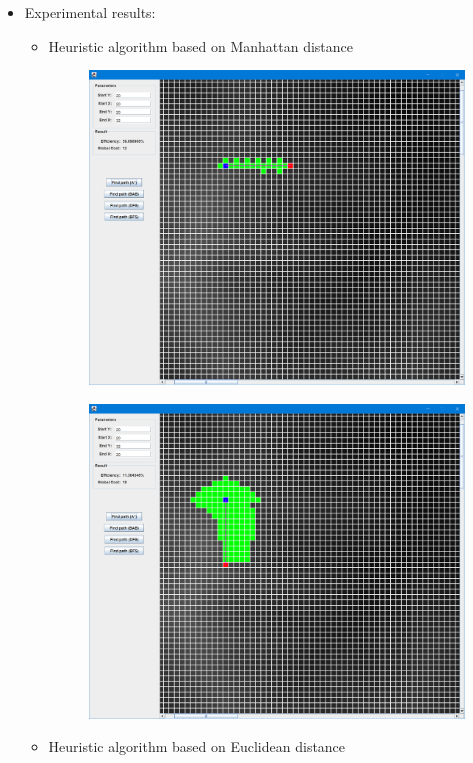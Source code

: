 \documentclass[
]{article}
\begin{document}
\begin{itemize}
  \begin{itemize}
  \item
    Experimental results:

    \begin{itemize}
    \item
      Heuristic algorithm based on Manhattan distance

      \begin{figure}
      \centering
      \includegraphics{./images/image-20210523082247436.png}
      \caption{}
      \end{figure}

      \begin{figure}
      \centering
      \includegraphics{./images/image-20210523082304339.png}
      \caption{}
      \end{figure}
    \item
      Heuristic algorithm based on Euclidean distance


\end{itemize}
\end{itemize}
\end{itemize}
\end{document}
